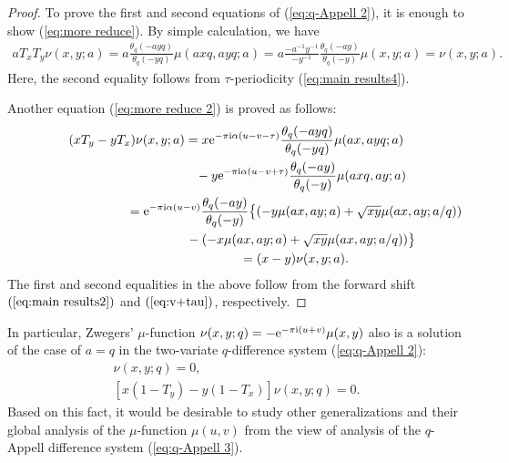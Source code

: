 \documentclass[pdftex]{sigma}
\numberwithin{equation}{section}
\theoremstyle{definition}
\begin{document}
\begin{proof}
To prove the first and second equations of (\ref{eq:q-Appell 2}), it is enough to show (\ref{eq:more reduce}).
By simple calculation, we have{\samepage
\begin{gather*}
aT_xT_y\nu(x,y;a)
=
 a\frac{\theta_q(-ayq)}{\theta_q(-yq)}\mu(axq,ayq;a) =
 a\frac{-a^{-1}y^{-1}}{-y^{-1}}\frac{\theta_q(-ay)}{\theta_q(-y)}\mu(x,y;a)
 =
 \nu(x,y;a).
\end{gather*}
Here, the second equality follows from $\tau$-periodicity (\ref{eq:main results4}).}


Another equation (\ref{eq:more reduce 2}) is proved as follows:
\begin{gather*}
(xT_y-yT_x)\nu(x,y;a)
 =
 x{\rm e}^{-\pi{\rm i}\alpha(u-v-\tau)}\frac{\theta_q(-ayq)}{\theta_q(-yq)}\mu(ax,ayq;a)\\
\hphantom{(xT_y-yT_x)\nu(x,y;a)=}{}
-y{\rm e}^{-\pi{\rm i}\alpha(u-v+\tau)}\frac{\theta_q(-ay)}{\theta_q(-y)}\mu(axq,ay;a)\\
\hphantom{(xT_y-yT_x)\nu(x,y;a)}{}
=
 {\rm e}^{-\pi{\rm i}\alpha(u-v)}\frac{\theta_q(-ay)}{\theta_q(-y)}\big\{ (-y\mu(ax,ay;a)+\sqrt{xy}\mu(ax,ay;a/q) ) \\
\hphantom{(xT_y-yT_x)\nu(x,y;a)=}{}
- (-x\mu(ax,ay;a)+\sqrt{xy}\mu(ax,ay;a/q) )\big\}\\
\hphantom{(xT_y-yT_x)\nu(x,y;a)}{}
=(x-y)\nu(x,y;a).
\end{gather*}
The first and second equalities in the above follow from the forward shift $(\ref{eq:main results2})$ and $(\ref{eq:v+tau})$, respectively.
\end{proof}

In particular, Zwegers' $\mu$-function $\nu(x,y;q)=-{\rm e}^{-\pi{\rm i}(u+v)}\mu(x,y)$ also is a solution of the case of $a=q$ in the two-variate $q$-difference system (\ref{eq:q-Appell 2}):
\begin{gather}
[1-qT_xT_y]\nu (x,y;q)=0, \nonumber\\
[x(1-T_y)-y(1-T_x)]\nu (x,y;q)=0.\label{eq:q-Appell 3}
\end{gather}
Based on this fact, it would be desirable to study other generalizations and their global analysis of the $\mu$-function $\mu(u,v)$ from the view of analysis of the $q$-Appell difference system (\ref{eq:q-Appell 3}).
\end{document}
